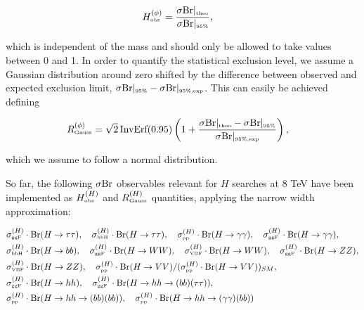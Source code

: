 \documentclass[preprint,3p,12pt]{elsarticle}
\begin{document}
{\begin{align}
 H^{(\phi )}_\text{\tiny obs} &= \frac{\sigma {\rm Br}|_{\text{\tiny{theo}}} }{\sigma {\rm Br}|_{\text{\tiny{95\%}}}} , \nonumber
\end{align}

which is independent of the mass and should only be allowed to take values between 0 and 1.
In order to quantify the statistical exclusion level, we assume a Gaussian distribution around zero shifted by the difference between observed and expected exclusion limit, $\sigma {\rm Br}|_{\text{\tiny{95\%}}}-\sigma {\rm Br}|_{\text{\tiny{95\%,exp}}}$. This can easily be achieved defining

\begin{align}
 R^{(\phi )}_\text{\tiny Gauss} &= \sqrt{2} \, \text{InvErf}(0.95) \left( 1 + \frac{\sigma {\rm Br}|_{\text{\tiny{theo}}} - \sigma {\rm Br}|_{\text{\tiny{95\%}}} }{\sigma {\rm Br}|_{\text{\tiny{95\%,exp}}}} \right) , \nonumber
\end{align}

which we assume to follow a normal distribution.

So far, the following $\sigma {\rm Br}$ observables relevant for $H$ searches at 8 TeV have been implemented as $H^{(H)}_\text{\tiny obs}$ and $R^{(H)}_\text{\tiny Gauss}$ quantities, applying the narrow width approximation:

\begin{align}
& \sigma ^{(H)}_{\text{\tiny{ggF}}} \cdot {\rm Br}(H\to \tau \tau ) , \quad \sigma ^{(H)}_{\text{\tiny{bbH}}} \cdot {\rm Br}(H\to \tau \tau ), \quad\sigma ^{(H)}_{\text{\tiny{pp}}} \cdot {\rm Br}(H\to \gamma \gamma ) , \quad \sigma ^{(H)}_{\text{\tiny{ggF}}} \cdot {\rm Br}(H\to \gamma \gamma ), \nonumber \\ %
& \sigma ^{(H)}_{\text{\tiny{bbH}}} \cdot {\rm Br}(H\to bb), \quad \sigma ^{(H)}_{\text{\tiny{ggF}}} \cdot {\rm Br}(H\to WW) , \quad \sigma ^{(H)}_{\text{\tiny{VBF}}} \cdot {\rm Br}(H\to WW), \quad \sigma ^{(H)}_{\text{\tiny{ggF}}} \cdot {\rm Br}(H\to ZZ), \nonumber \\ %
& \sigma ^{(H)}_{\text{\tiny{VBF}}} \cdot {\rm Br}(H\to ZZ), \quad \sigma ^{(H)}_{\text{\tiny{pp}}} \cdot {\rm Br}(H\to VV) /  (\sigma ^{(H)}_{\text{\tiny{pp}}} \cdot {\rm Br}(H\to VV) )_{SM}, \nonumber \\ %
& \sigma ^{(H)}_{\text{\tiny{ggF}}} \cdot {\rm Br}(H\to hh) , \quad \sigma ^{(H)}_{\text{\tiny{ggF}}} \cdot {\rm Br}(H\to hh \to (bb)(\tau \tau )), \nonumber \\ %
& \sigma ^{(H)}_{\text{\tiny{pp}}} \cdot {\rm Br}(H\to hh \to (bb)(bb)) , \quad \sigma ^{(H)}_{\text{\tiny{pp}}} \cdot {\rm Br}(H\to hh \to (\gamma \gamma )(bb)) \nonumber %
\end{align}

}
\end{document}
